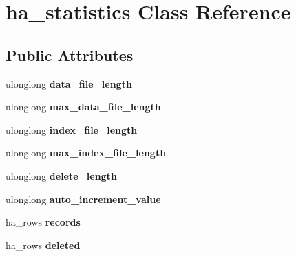\hypertarget{classha__statistics}{}\section{ha\+\_\+statistics Class Reference}
\label{classha__statistics}
\subsection*{Public Attributes}
\begin{DoxyCompactItemize}
\item 
\mbox{\label{classha__statistics_a10fb3ebfede285b0c2f6a517ab12611f}} 
ulonglong {\bfseries data\+\_\+file\+\_\+length}
\item 
\mbox{\label{classha__statistics_a310564069385eed892284b42aa871575}} 
ulonglong {\bfseries max\+\_\+data\+\_\+file\+\_\+length}
\item 
\mbox{\label{classha__statistics_a06f15196d432e6b73b1e279ae388d0ef}} 
ulonglong {\bfseries index\+\_\+file\+\_\+length}
\item 
\mbox{\label{classha__statistics_a698d975b426b38c452ac2917635c2819}} 
ulonglong {\bfseries max\+\_\+index\+\_\+file\+\_\+length}
\item 
\mbox{\label{classha__statistics_a89fe3ad9416f6e8f39d0a376ada7ab13}} 
ulonglong {\bfseries delete\+\_\+length}
\item 
\mbox{\label{classha__statistics_a8007c84c3ca6b3c5e39a8d4e07f84b11}} 
ulonglong {\bfseries auto\+\_\+increment\+\_\+value}
\item 
\mbox{\label{classha__statistics_a29a4415e084ded6271c3e8033ee2537c}} 
ha\+\_\+rows {\bfseries records}
\item 
\mbox{\label{classha__statistics_afeaf8b17647936c574b9f05bf9986ef9}} 
ha\+\_\+rows {\bfseries deleted}
\item 
\mbox{\label{classha__statistics_a7d701be6137eb864281584f97789381b}} 

\end{DoxyCompactItemize}
